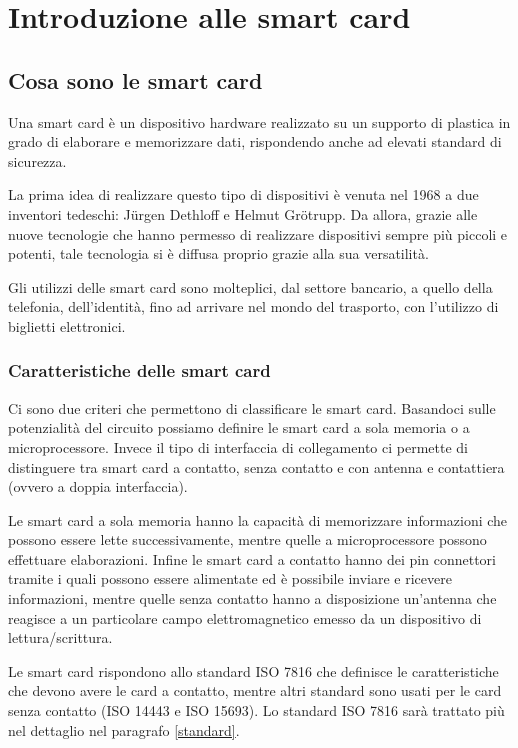 \chapter{Introduzione alle smart card}
\label{chapter1}

\section{Cosa sono le smart card}
\label{intro}
Una smart card è un dispositivo hardware realizzato su un supporto di plastica in grado di elaborare e memorizzare dati, rispondendo anche ad elevati standard di sicurezza.

La prima idea di realizzare questo tipo di dispositivi è venuta nel 1968 a due inventori tedeschi: Jürgen Dethloff e Helmut Grötrupp. Da allora, grazie alle nuove tecnologie che hanno permesso di realizzare dispositivi sempre più piccoli e potenti, tale tecnologia si è diffusa proprio grazie alla sua versatilità.

Gli utilizzi delle smart card sono molteplici, dal settore bancario, a quello della telefonia, dell'identità, fino ad arrivare nel mondo del trasporto, con l'utilizzo di biglietti elettronici.
\cite{wiki_sc}

\subsection{Caratteristiche  delle smart card}

Ci sono due criteri che permettono di classificare le smart card. Basandoci sulle potenzialità del circuito possiamo definire le smart card a sola memoria o a microprocessore. Invece il tipo di interfaccia di collegamento ci permette di distinguere tra smart card a contatto, senza contatto e con antenna e contattiera (ovvero a doppia interfaccia).

Le smart card a sola memoria hanno la capacità di memorizzare informazioni che possono essere lette successivamente, mentre quelle a microprocessore possono effettuare elaborazioni. Infine le smart card a contatto hanno dei pin connettori tramite i quali possono essere alimentate ed è possibile inviare e ricevere informazioni, mentre quelle senza contatto hanno a disposizione un'antenna che reagisce a un particolare campo elettromagnetico emesso da un dispositivo di lettura/scrittura.

Le smart card rispondono allo standard ISO 7816 che definisce le caratteristiche che devono avere le card a contatto, mentre altri standard sono usati per le card senza contatto (ISO 14443 e ISO 15693). Lo standard ISO 7816 sarà trattato più nel dettaglio nel paragrafo \ref{standard}.

